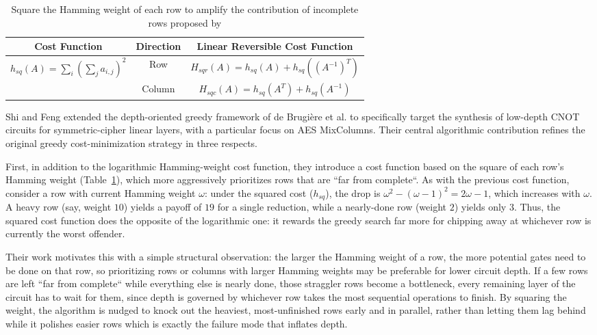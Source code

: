\begin{table}[htbp]
\centering
\begin{tabular}{c|c|c}
\hline
Cost Function & Direction  & Linear Reversible Cost Function\\
\hline
\multirow{2}{*}{$h_{sq}(A) = \sum_{i}(\sum_{j}a_{i,j})^{2}$} & Row & $H_{sqr}(A) = h_{sq}(A) + h_{sq}((A^{-1})^{T})$ \\ 
\cline{2-3}
& Column & $H_{sqc}(A) = h_{sq}(A^{T}) + h_{sq}(A^{-1})$ \\ 
\hline
\end{tabular}
	\caption{Square the Hamming weight of each row to amplify the contribution of incomplete rows proposed by \cite{cryptoeprint:2024/381}}
	\label{tab:square-hamming-weight}
\end{table}

Shi and Feng \cite{cryptoeprint:2024/381} extended the depth-oriented greedy framework of de Brugière et al. to specifically target the synthesis of low-depth CNOT circuits for symmetric-cipher linear layers, with a particular focus on AES MixColumns. Their central algorithmic contribution refines the original greedy cost-minimization strategy in three respects. 

First, in addition to the logarithmic Hamming-weight cost function, they
introduce a cost function based on the square of each row's Hamming weight
(Table~\ref{tab:square-hamming-weight}), which more aggressively prioritizes
rows that are ``far from complete``. As with the previous cost function,
consider a row with current Hamming weight $\omega$: under the squared cost
($h_{sq}$), the drop is $\omega^{2} - (\omega-1)^{2} = 2\omega - 1$, which
increases with $\omega$. A heavy row (say, weight $10$) yields a payoff of
$19$ for a single reduction, while a nearly-done row (weight $2$) yields only
$3$. Thus, the squared cost function does the opposite of the logarithmic
one: it rewards the greedy search far more for chipping away at whichever row
is currently the worst offender.

Their work motivates this with a simple structural observation: the larger the Hamming weight of a row, the more potential gates need to be done on that row, so prioritizing rows or columns with larger Hamming weights may be preferable for lower circuit depth. If a few rows are left ``far from complete`` while everything else is nearly done, those straggler rows become a bottleneck, every remaining layer of the circuit has to wait for them, since depth is governed by whichever row takes the most sequential operations to finish. By squaring the weight, the algorithm is nudged to knock out the heaviest, most-unfinished rows early and in parallel, rather than letting them lag behind while it polishes easier rows which is exactly the failure mode that inflates depth.

